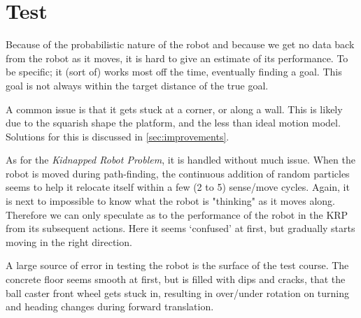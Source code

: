 \documentclass[Main]{subfiles}
\begin{document}
\section{Test} %
\label{sec:test}

	Because of the probabilistic nature of the robot and because we get no data back from the robot as it moves, it is hard to give an estimate of its performance.
	To be specific; it (sort of) works most off the time, eventually finding a goal.
	This goal is not always within the target distance of the true goal.

	A common issue is that it gets stuck at a corner, or along a wall.
	This is likely due to the squarish shape the platform, and the less than ideal motion model. Solutions for this is discussed in \autoref{sec:improvements}.

	As for the \emph{Kidnapped Robot Problem}, it is handled without much issue.
	When the robot is moved during path-finding, the continuous addition of random particles seems to help it relocate itself within a few (2 to 5) sense/move cycles.
	Again, it is next to impossible to know what the robot is "thinking" as it moves along.
	Therefore we can only speculate as to the performance of the robot in the KRP from its subsequent actions.
	Here it seems `confused' at first, but gradually starts moving in the right direction.

	A large source of error in testing the robot is the surface of the test course.
	The concrete floor seems smooth at first, but is filled with dips and cracks, that the ball caster front wheel gets stuck in, resulting in over/under rotation on turning and heading changes during forward translation.


\end{document}
